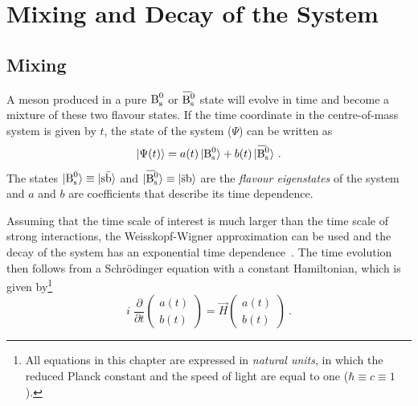 \section{Mixing and Decay of the \texorpdfstring{\BsBsbar{}}{Bs0Bs0bar} System}
\label{sec:pheno_mix}

\subsection{Mixing}
\label{sec:pheno_mix_mix}

A meson produced in a pure $\text{B}_\text{s}^\text{0}$ or $\Bsbar$ state will evolve in time and become a mixture of these two flavour states. If the time
coordinate in the \BsBsbar{} centre-of-mass system is given by $t$, the state of the system ($\Psi$) can be written as
\begin{equation}
  \label{eq:timeEvolBBbarState}
  |\Psi(t)\rangle = a(t)\,\Bsst + b(t)\,\Bsbarst
  \ .
\end{equation}
The states $|\text{B}_\text{s}^\text{0}\rangle\equiv|\text{s}\bar{\text{b}}\rangle$ and $\Bsbarst\equiv|\bar{\text{s}}\text{b}\rangle$ are the \emph{flavour
eigenstates} of the system and $a$ and $b$ are coefficients that describe its time dependence.

Assuming that the time scale of interest is much larger than the time scale of strong interactions, the Weisskopf-Wigner approximation can
be used and the decay of the system has an exponential time dependence~\cite{Weisskopf:1930au,*Weisskopf:1930ps,*Lee:1957qq}. The time
evolution then follows from a Schr\"odinger equation with a constant Hamiltonian, which is given by\footnote{All equations in this chapter
are expressed in \emph{natural units}, in which the reduced Planck constant and the speed of light are equal to one ($\hbar \equiv c \equiv
1$).}
\begin{equation}
  \label{eq:timeEvolSchr}
  i\; \frac{\partial}{\partial t} \begin{pmatrix} a(t) \\ b(t) \end{pmatrix}
    = \vec{H} \begin{pmatrix} a(t) \\ b(t) \end{pmatrix}
    \ .
\end{equation}

